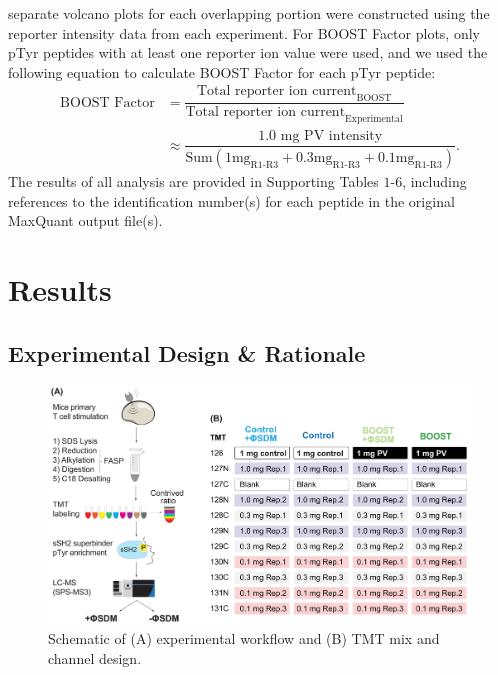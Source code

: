 \documentclass[journal=jprobs,manuscript=article]{achemso}
\begin{document}
separate volcano plots for each overlapping portion were constructed using the reporter intensity data from each experiment. For BOOST Factor plots, only pTyr peptides with at least one reporter ion value were used, and we used the following equation to calculate BOOST Factor for each pTyr peptide:
\begin{equation}
\begin{aligned}
\text{BOOST Factor} & =  \dfrac{\text{Total reporter ion current}_{\text{BOOST}}}{\text{Total reporter ion current}_{\text{Experimental}}} \\
& \approx \dfrac{1.0\text{ mg PV intensity}}{\text{Sum}(1\text{mg}_{\text{R1-R3}} + 0.3\text{mg}_{\text{R1-R3}} + 0.1\text{mg}_{\text{R1-R3}})}.
\end{aligned}
\end{equation}
The results of all analysis are provided in Supporting Tables $1$-$6$, including references to the identification number(s) for each peptide in the original MaxQuant output file(s). 

\section{Results}



\subsection{Experimental Design \& Rationale}

\begin{figure}[!h]
\centering
\includegraphics[width=150mm]{figures/main_figs/experimental_design.pdf}
\caption{Schematic of (A) experimental workflow and (B) TMT mix and channel design.}\label{experimental_design}
\end{figure}
\end{document}
